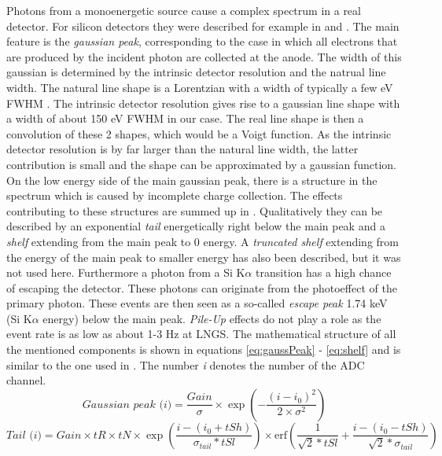 Photons from a monoenergetic source cause a complex spectrum in a real detector. For silicon detectors they were described for example in \cite{Campbell2001} and \cite{Okada}. The main feature is the \textit{gaussian peak}, corresponding to the case in which all electrons that are produced by the incident photon are collected at the anode. The width of this gaussian is determined by the intrinsic detector resolution and the natrual line width. The natural line shape is a Lorentzian with a width of typically a few eV FWHM \cite{Krause1979}. The intrinsic detector resolution gives rise to a gaussian line shape with a width of about 150 eV FWHM in our case. The real line shape is then a convolution of these 2 shapes, which would be a Voigt function. As the intrinsic detector resolution is by far larger than the natural line width, the latter contribution is small and the shape can be approximated by a gaussian function. On the low energy side of the main gaussian peak, there is a structure in the spectrum which is caused by incomplete charge collection. The effects contributing to these structures are summed up in \cite{Campbell2001}. Qualitatively they can be described by an exponential \textit{tail} energetically right below the main peak and a \textit{shelf} extending from the main peak to 0 energy. A \textit{truncated shelf} extending from the energy of the main peak to smaller energy has also been described, but it was not used here. Furthermore a photon from a Si K$\alpha$ transition has a high chance of escaping the detector. These photons can originate from the photoeffect of the primary photon. These events are then seen as a so-called \textit{escape peak} 1.74 keV (Si K$\alpha$ energy) below the main peak. \textit{Pile-Up}  effects do not play a role as the event rate is as low as about 1-3 Hz at LNGS. The mathematical structure of all the mentioned components is shown in equations \ref{eq:gaussPeak} - \ref{eq:shelf} and is similar to the one used in \cite{Okada}. The number \textit{i} denotes the number of the ADC channel.
\begin{equation}
 \textit{Gaussian peak (i)} = \frac{Gain}{\sigma} \times \exp(-\frac{(i-i_{0})^{2}}{2 \times \sigma^{2}})
 \label{eq:gaussPeak}
\end{equation} 
\begin{equation}
 \textit{Tail (i)} = Gain \times tR \times tN \times \exp(\frac{i-(i_{0}+tSh)}{\sigma_{tail}*tSl}) \times \textrm{erf}(\frac{1}{\sqrt{2}*tSl}+\frac{i-(i_{0}-tSh)}{\sqrt{2}*\sigma_{tail}})
\end{equation} 

